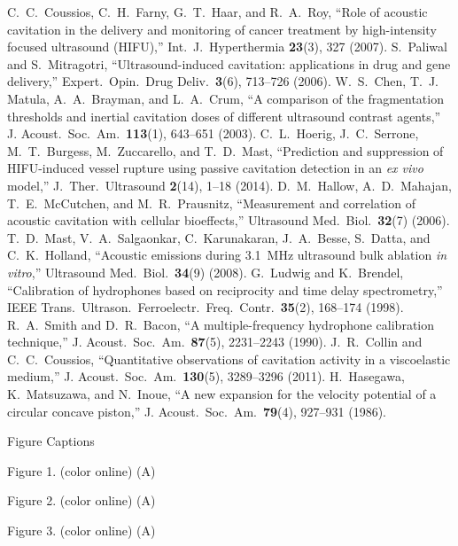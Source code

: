 \documentclass[12pt, titlepage, reqno]{article}
\theoremstyle{plain}
\begin{document}
 \begin{thebibliography}{99}
 

 		C.\ C.\ Coussios, C.\ H.\ Farny, G.\ T.\ Haar, and R.\ A.\ Roy, ``Role of acoustic cavitation in the delivery and monitoring of cancer treatment by high-intensity focused ultrasound (HIFU),'' Int.\ J.\ Hyperthermia {\bf 23}(3), 327 (2007).
 		S.\ Paliwal and S.\ Mitragotri, ``Ultrasound-induced cavitation: applications in drug and gene delivery,'' Expert.\ Opin.\ Drug Deliv.\, {\bf 3}(6), 713--726 (2006).
 		W.\ S.\ Chen, T.\ J. Matula, A.\ A.\ Brayman, and L.\ A.\ Crum, ``A comparison of the fragmentation thresholds and inertial cavitation doses of different ultrasound contrast agents,'' J. Acoust.\ Soc.\ Am.\ {\bf 113}(1), 643--651 (2003).
 		C.\ L.\ Hoerig, J.\ C.\ Serrone, M.\ T.\ Burgess, M.\ Zuccarello, and T.\ D.\ Mast, ``Prediction and suppression of HIFU-induced vessel rupture using passive cavitation detection in an {\em ex vivo} model,'' J.\ Ther.\ Ultrasound {\bf 2}(14), 1--18 (2014).
 		D.\ M.\ Hallow, A.\ D.\ Mahajan, T.\ E.\ McCutchen, and M.\ R.\ Prausnitz, ``Measurement and correlation of acoustic cavitation with cellular bioeffects,'' Ultrasound Med.\ Biol.\, {\bf 32}(7) (2006).
 		T.\ D.\ Mast, V.\ A.\ Salgaonkar, C.\ Karunakaran, J.\ A.\ Besse, S.\ Datta, and C.\ K.\ Holland, ``Acoustic emissions during 3.1~MHz ultrasound bulk ablation {\em in vitro},'' Ultrasound Med.\ Biol.\ {\bf 34}(9) (2008).
 		G.\ Ludwig and K.\ Brendel, ``Calibration of hydrophones based on reciprocity and time delay spectrometry,'' IEEE Trans.\ Ultrason.\ Ferroelectr.\ Freq.\ Contr.\ {\bf 35}(2), 168--174 (1998).
 		R.\ A.\ Smith and D.\ R.\ Bacon,  ``A multiple-frequency hydrophone calibration technique,'' J. Acoust.\ Soc.\ Am.\ {\bf 87}(5), 2231--2243 (1990). 
 		J.\ R.\ Collin and C.\ C.\ Coussios, ``Quantitative observations of cavitation activity in a viscoelastic medium,'' J. Acoust.\ Soc.\ Am.\ {\bf 130}(5), 3289--3296 (2011). 
 		H.\ Hasegawa, K.\ Matsuzawa, and N.\ Inoue, ``A new expansion for the velocity potential of a circular concave piston,'' J. Acoust.\ Soc.\ Am.\ {\bf 79}(4), 927--931 (1986). 
 		
 
 	
 \end{thebibliography}
 
 
 \newpage
 
 \begin{center}
 
 \large{Figure Captions}
 
 \end{center}
 
 
 \noindent
 Figure 1. (color online)  (A) \lipsum[1]
 
 \smallskip
 
 \noindent
 Figure 2.  (color online) (A) \lipsum[2]
 
  \smallskip
 
 \noindent
 Figure 3. (color online)  (A)\lipsum[3]
 

 
   
 
\end{document}

